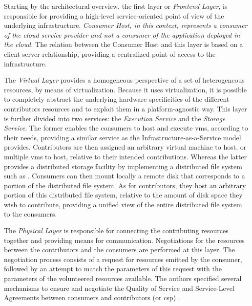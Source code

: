 \documentclass[12pt, titlepage]{uo_temp}
\begin{document}
     Starting by the architectural overview, the first layer or \emph{Frontend Layer}, is
     responsible for providing a high-level service-oriented point of view of the
     underlying infrastructure. \emph{Consumer Host, in this context, represents a consumer
       of the cloud service provider and not a consumer of the application deployed in the
       cloud.} The relation between the Consumer Host and this layer is based on a
     client-server relationship, providing a centralized point of access to the
     infrastructure.
     
     The \emph{Virtual Layer} provides a homogeneous perspective of a set of heterogeneous
     resources, by means of virtualization. Because it uses virtualization, it is possible to
     completely abstract the underlying hardware specificities of the different
     contributors resources and to exploit them in a platform-agnostic way. This layer is
     further divided into two services: the \emph{Execution Service} and the \emph{Storage
       Service}. The former enables the consumers to host and execute \gls{vm}s, according
     to their needs, providing a similar service as the Infrastructure-as-a-Service model
     provides. Contributors are then assigned an arbitrary virtual machine to host, or multiple
     \gls{vm}s to host, relative to their intended contributions. Whereas the latter
     provides a distributed storage facility by implementing a distributed file system
     such as \cite{gfs}. Consumers can then mount locally a remote disk that corresponds to a
     portion of the distributed file system. As for contributors, they host an arbitrary
     portion of this distributed file system, relative to the amount of disk space they wish to
     contribute, providing a unified view of the entire distributed file system to the
     consumers.
     
     The \emph{Physical Layer} is responsible for connecting the contributing resources
     together and providing means for communication. Negotiations for the resources
     between the contributors and the consumers are performed at this layer. The
     negotiation process consists of a request for resources emitted by the consumer,
     followed by an attempt to match the parameters of this request with the parameters of
     the volunteered resources available. The authors specified several mechanisms to ensure and
     negotiate the Quality of Service and Service-Level Agreements between consumers and
     contributors (or \gls{csp}) \cite{aversa2011cloudperf}\cite{aversa2011cloud}.
     
\end{document}
